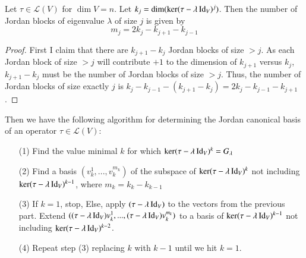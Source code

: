 \begin{theorem}
    Let $\tau \in \mathcal{L}(V)$ for $\dim V = n$. Let $k_j = \dim(\ker(\tau-\lambda\operatorname{Id}_V)^j)$. Then the number of Jordan blocks of eigenvalue $\lambda$ of size $j$ is given by $$m_j = 2k_j - k_{j+1}-k_{j-1}$$
\end{theorem}
\begin{proof}
    First I claim that there are $k_{j+1}-k_j$ Jordan blocks of size $> j$. As each Jordan block of size $> j$ will contribute $+1$ to the dimension of $k_{j+1}$ versus $k_j$, $k_{j+1}-k_j$ must be the number of Jordan blocks of size $> j$. Thus, the number of Jordan blocks of size exactly $j$ is $k_j - k_{j-1} - (k_{j+1} - k_j) = 2k_j - k_{j-1} - k_{j+1}$.
\end{proof}

Then we have the following algorithm for determining the Jordan canonical basis of an operator $\tau \in \mathcal{L}(V)$: 

\begin{itemize}
    \item[(1)] Find the value minimal $k$ for which $\ker(\tau-\lambda \operatorname{Id}_V)^k = G_{\lambda}$
    \item[(2)] Find a basis $(v_k^1,...,v_k^{m_k})$ of the subspace of $\ker(\tau-\lambda\operatorname{Id}_V)^k$ not including $\ker(\tau-\lambda\operatorname{Id}_V)^{k-1}$, where $m_k = k_k-k_{k-1}$
    \item[(3)] If $k = 1$, stop, Else, apply $(\tau - \lambda\operatorname{Id}_V)$ to the vectors from the previous part. Extend $((\tau-\lambda \operatorname{Id}_V)v_k^1,...,(\tau-\lambda\operatorname{Id}_V)v_k^{m_k})$ to a basis of $\ker(\tau-\lambda\operatorname{Id}_V)^{k-1}$ not including $\ker(\tau-\lambda\operatorname{Id}_V)^{k-2}$.
    \item[(4)] Repeat step (3) replacing $k$ with $k-1$ until we hit $k = 1$.
\end{itemize}


